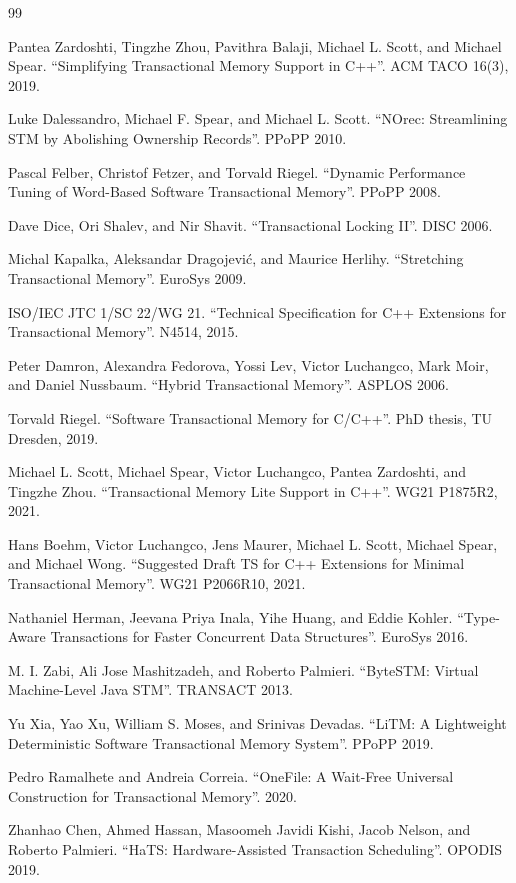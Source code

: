 \documentclass[article,12pt]{article}
\begin{document}

\begin{thebibliography}{99}

Pantea Zardoshti, Tingzhe Zhou, Pavithra Balaji, Michael L. Scott, and Michael Spear.
``Simplifying Transactional Memory Support in C++''.
ACM TACO 16(3), 2019.

Luke Dalessandro, Michael F. Spear, and Michael L. Scott.
``NOrec: Streamlining STM by Abolishing Ownership Records''.
PPoPP 2010.

Pascal Felber, Christof Fetzer, and Torvald Riegel.
``Dynamic Performance Tuning of Word-Based Software Transactional Memory''.
PPoPP 2008.

Dave Dice, Ori Shalev, and Nir Shavit.
``Transactional Locking II''.
DISC 2006.

Michal Kapalka, Aleksandar Dragojevi\'c, and Maurice Herlihy.
``Stretching Transactional Memory''.
EuroSys 2009.

ISO/IEC JTC 1/SC 22/WG 21.
``Technical Specification for C++ Extensions for Transactional Memory''.
N4514, 2015.

Peter Damron, Alexandra Fedorova, Yossi Lev, Victor Luchangco, Mark Moir, and Daniel Nussbaum.
``Hybrid Transactional Memory''.
ASPLOS 2006.

Torvald Riegel.
``Software Transactional Memory for C/C++''.
PhD thesis, TU Dresden, 2019.

Michael L. Scott, Michael Spear, Victor Luchangco, Pantea Zardoshti, and Tingzhe Zhou.
``Transactional Memory Lite Support in C++''.
WG21 P1875R2, 2021.

Hans Boehm, Victor Luchangco, Jens Maurer, Michael L. Scott, Michael Spear, and Michael Wong.
``Suggested Draft TS for C++ Extensions for Minimal Transactional Memory''.
WG21 P2066R10, 2021.

Nathaniel Herman, Jeevana Priya Inala, Yihe Huang, and Eddie Kohler.
``Type-Aware Transactions for Faster Concurrent Data Structures''.
EuroSys 2016.

M. I. Zabi, Ali Jose Mashitzadeh, and Roberto Palmieri.
``ByteSTM: Virtual Machine-Level Java STM''.
TRANSACT 2013.

Yu Xia, Yao Xu, William S. Moses, and Srinivas Devadas.
``LiTM: A Lightweight Deterministic Software Transactional Memory System''.
PPoPP 2019.

Pedro Ramalhete and Andreia Correia.
``OneFile: A Wait-Free Universal Construction for Transactional Memory''.
2020.

Zhanhao Chen, Ahmed Hassan, Masoomeh Javidi Kishi, Jacob Nelson, and Roberto Palmieri.
``HaTS: Hardware-Assisted Transaction Scheduling''.
OPODIS 2019.

\end{thebibliography}
\end{document}
